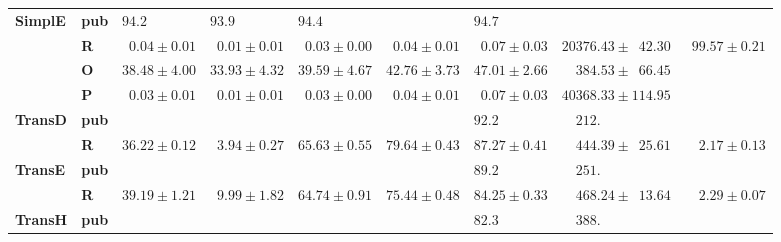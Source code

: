 \begin{tabular}{llrrrrrrr}
\textbf{SimplE} & \textbf{pub} &  $94.2\phantom{0 \pm 0.00}$ &  $93.9\phantom{0 \pm 0.00}$ &  $94.4\phantom{0 \pm 0.00}$ &                             &  $94.7\phantom{0 \pm 0.00}$ &                                            &                              \\
       & \textbf{R} &  $\phantom{0}0.04 \pm 0.01$ &  $\phantom{0}0.01 \pm 0.01$ &  $\phantom{0}0.03 \pm 0.00$ &  $\phantom{0}0.04 \pm 0.01$ &  $\phantom{0}0.07 \pm 0.03$ &            $20376.43 \pm \phantom{0}42.30$ &  $\phantom{0}99.57 \pm 0.21$ \\
       & \textbf{O} &            $38.48 \pm 4.00$ &            $33.93 \pm 4.32$ &            $39.59 \pm 4.67$ &            $42.76 \pm 3.73$ &            $47.01 \pm 2.66$ &  $\phantom{00}384.53 \pm \phantom{0}66.45$ &                              \\
       & \textbf{P} &  $\phantom{0}0.03 \pm 0.01$ &  $\phantom{0}0.01 \pm 0.01$ &  $\phantom{0}0.03 \pm 0.00$ &  $\phantom{0}0.04 \pm 0.01$ &  $\phantom{0}0.07 \pm 0.03$ &                      $40368.33 \pm 114.95$ &                              \\\midrule
\textbf{TransD} & \textbf{pub} &                             &                             &                             &                             &  $92.2\phantom{0 \pm 0.00}$ &  $\phantom{00}212.\phantom{00 \pm 000.00}$ &                              \\
       & \textbf{R} &            $36.22 \pm 0.12$ &  $\phantom{0}3.94 \pm 0.27$ &            $65.63 \pm 0.55$ &            $79.64 \pm 0.43$ &            $87.27 \pm 0.41$ &  $\phantom{00}444.39 \pm \phantom{0}25.61$ &  $\phantom{00}2.17 \pm 0.13$ \\\midrule
\textbf{TransE} & \textbf{pub} &                             &                             &                             &                             &  $89.2\phantom{0 \pm 0.00}$ &  $\phantom{00}251.\phantom{00 \pm 000.00}$ &                              \\
       & \textbf{R} &            $39.19 \pm 1.21$ &  $\phantom{0}9.99 \pm 1.82$ &            $64.74 \pm 0.91$ &            $75.44 \pm 0.48$ &            $84.25 \pm 0.33$ &  $\phantom{00}468.24 \pm \phantom{0}13.64$ &  $\phantom{00}2.29 \pm 0.07$ \\\midrule
\textbf{TransH} & \textbf{pub} &                             &                             &                             &                             &  $82.3\phantom{0 \pm 0.00}$ &  $\phantom{00}388.\phantom{00 \pm 000.00}$ &                              \\

\end{tabular}
